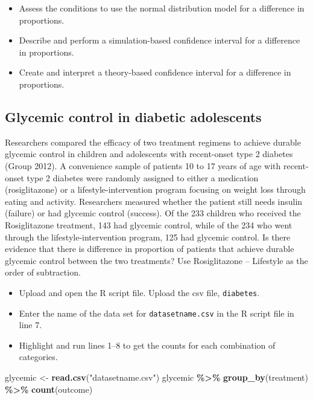 \documentclass[
]{report}
\newenvironment{Shaded}{\begin{snugshade}}{\end{snugshade}}
\newcommand{\FunctionTok}[1]{\textcolor[rgb]{0.13,0.29,0.53}{\textbf{#1}}}
\newcommand{\NormalTok}[1]{#1}
\newcommand{\OtherTok}[1]{\textcolor[rgb]{0.56,0.35,0.01}{#1}}
\newcommand{\SpecialCharTok}[1]{\textcolor[rgb]{0.81,0.36,0.00}{\textbf{#1}}}
\newcommand{\StringTok}[1]{\textcolor[rgb]{0.31,0.60,0.02}{#1}}
\begin{document}
\begin{itemize}
\item
  Assess the conditions to use the normal distribution model for a difference in proportions.
\item
  Describe and perform a simulation-based confidence interval for a difference in proportions.
\item
  Create and interpret a theory-based confidence interval for a difference in proportions.
\end{itemize}

\subsection{Glycemic control in diabetic adolescents}\label{glycemic-control-in-diabetic-adolescents}

Researchers compared the efficacy of two treatment regimens to achieve durable glycemic control in children and adolescents with recent-onset type 2 diabetes (Group 2012). A convenience sample of patients 10 to 17 years of age with recent-onset type 2 diabetes were randomly assigned to either a medication (rosiglitazone) or a lifestyle-intervention program focusing on weight loss through eating and activity. Researchers measured whether the patient still needs insulin (failure) or had glycemic control (success). Of the 233 children who received the Rosiglitazone treatment, 143 had glycemic control, while of the 234 who went through the lifestyle-intervention program, 125 had glycemic control. Is there evidence that there is difference in proportion of patients that achieve durable glycemic control between the two treatments? Use Rosiglitazone -- Lifestyle as the order of subtraction.

\begin{itemize}
\item
  Upload and open the R script file. Upload the csv file, \texttt{diabetes}.
\item
  Enter the name of the data set for \texttt{datasetname.csv} in the R script file in line 7.
\item
  Highlight and run lines 1--8 to get the counts for each combination of categories.
\end{itemize}

\begin{Shaded}
\begin{Highlighting}[]
\NormalTok{glycemic }\OtherTok{\textless{}{-}} \FunctionTok{read.csv}\NormalTok{(}\StringTok{"datasetname.csv"}\NormalTok{)}
\NormalTok{glycemic }\SpecialCharTok{\%\textgreater{}\%} \FunctionTok{group\_by}\NormalTok{(treatment) }\SpecialCharTok{\%\textgreater{}\%} \FunctionTok{count}\NormalTok{(outcome)}
\end{Highlighting}
\end{Shaded}
\end{document}
